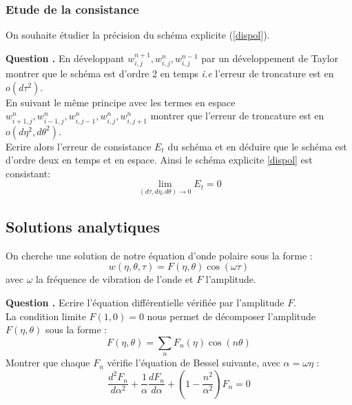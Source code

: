 \documentclass[a4,12pt]{article}
\newcounter{Nbquestion}
\newcommand*\question{%
\stepcounter{Nbquestion}%
\textbf{Question \theNbquestion. }}
\begin{document}
\subsubsection{Etude de la consistance}
On souhaite étudier la précision du schéma explicite (\ref{dispol}).


\begin{mdframed}[style=exampledefault]
\question En développant $w_{i,j}^{n+1},w_{i,j}^{n},w_{i,j}^{n-1}$ par un développement de Taylor montrer que le schéma est d'ordre 2 en temps \textit{i.e} l'erreur de troncature est en $o(d\tau^2)$.\\
En suivant le même principe avec les termes en espace $w_{i+1,j}^{n},w_{i-1,j}^{n},w_{i,j-1}^{n},w_{i,j}^{n},w_{i,j+1}^{n}$ montrer que l'erreur de troncature est en $o (d\eta^2,d\theta^2)$.\\
Ecrire alors l'erreur de consistance $E_t$ du schéma et en déduire que le schéma est d'ordre deux en temps et en espace.
Ainsi le schéma explicite \ref{dispol} est consistant:
\[
\lim_{(d\tau,d\eta,d\theta)\longrightarrow 0} E_t=0
\]
\end{mdframed}


\subsection{Solutions analytiques }
On cherche une solution de notre équation d'onde polaire sous la forme :
\[
w(\eta,\theta,\tau)=F(\eta,\theta)\cos(\omega \tau)
\]
avec $\omega$ la fréquence de vibration de l'onde et $F$ l'amplitude.


\begin{mdframed}[style=exampledefault]
\question Ecrire l'équation différentielle vérifiée par l'amplitude $F$.\\

La condition limite $F(1,0)=0$ nous permet de décomposer l'amplitude $F(\eta,\theta)$ sous la forme :
\[
F(\eta,\theta)=\sum_n F_n(\eta)\cos(n\theta)
\]
Montrer que chaque $F_n$ vérifie l'équation de Bessel suivante, avec  $\alpha=\omega\eta$ :
\[
\frac{d^2 F_n}{d\alpha^2}+\frac{1}{\alpha}\frac{dF_n}{d\alpha}+\left(1-\frac{n^2}{\alpha^2}\right)F_n=0
\]
\end{mdframed}

\end{document}

